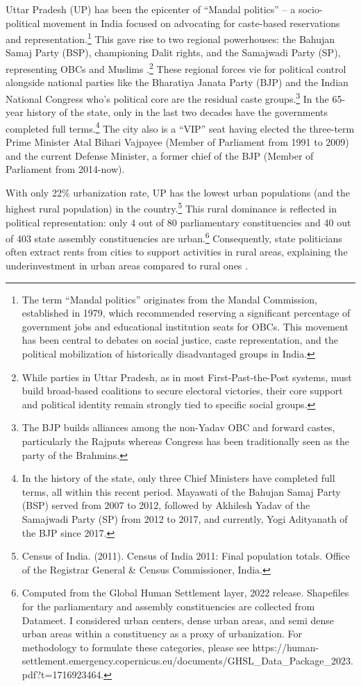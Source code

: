 Uttar Pradesh (UP) has been the epicenter of ``Mandal politics'' – a socio-political movement in India focused on advocating for caste-based reservations and representation.\footnote{The term ``Mandal politics'' originates from the Mandal Commission, established in 1979, which recommended reserving a significant percentage of government jobs and educational institution seats for OBCs. This movement has been central to debates on social justice, caste representation, and the political mobilization of historically disadvantaged groups in India.} This gave rise to two regional powerhouses: the Bahujan Samaj Party (BSP), championing Dalit rights, and the Samajwadi Party (SP), representing OBCs and Muslims \citep{Pai2013}.\footnote{While parties in Uttar Pradesh, as in most First-Past-the-Post systems, must build broad-based coalitions to secure electoral victories, their core support and political identity remain strongly tied to specific social groups.} These regional forces vie for political control alongside national parties like the Bharatiya Janata Party (BJP) and the Indian National Congress who's political core are the residual caste groups.\footnote{The BJP builds alliances among the non-Yadav OBC and forward castes, particularly the Rajputs whereas Congress has been traditionally seen as the party of the Brahmins.} In the 65-year history of the state, only in the last two decades have the governments completed full terms.\footnote{In the history of the state, only three Chief Ministers have completed full terms, all within this recent period. Mayawati of the Bahujan Samaj Party (BSP) served from 2007 to 2012, followed by Akhilesh Yadav of the Samajwadi Party (SP) from 2012 to 2017, and currently, Yogi Adityanath of the BJP since 2017.} The city also is a ``VIP'' seat having elected the three-term Prime Minister Atal Bihari Vajpayee (Member of Parliament from 1991 to 2009) and the current Defense Minister, a former chief of the BJP (Member of Parliament from 2014-now).

With only 22\% urbanization rate, UP has the lowest urban populations (and the highest rural population) in the country.\footnote{Census of India. (2011). Census of India 2011: Final population totals. Office of the Registrar General \& Census Commissioner, India.} This rural dominance is reflected in political representation: only 4 out of 80 parliamentary constituencies and 40 out of 403 state assembly constituencies are urban.\footnote{Computed from the Global Human Settlement layer, 2022 release. Shapefiles for the parliamentary and assembly constituencies are collected from Datameet. I considered urban centers, dense urban areas, and semi dense urban areas within a constituency as a proxy of urbanization. For methodology to formulate these categories, please see https://human-settlement.emergency.copernicus.eu/documents/GHSL\_Data\_Package\_2023.pdf?t=1716923464.} Consequently, state politicians often extract rents from cities to support activities in rural areas, explaining the underinvestment in urban areas compared to rural ones \citep{Varshney1995}.

